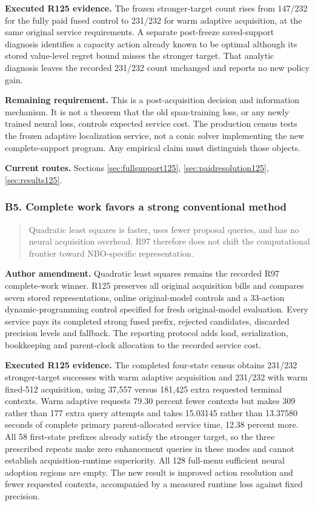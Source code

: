\noindent\textbf{Executed R125 evidence.} The frozen stronger-target count rises from 147/232 for the fully paid fused control to 231/232 for warm adaptive acquisition, at the same original service requirements. A separate post-freeze saved-support diagnosis identifies a capacity action already known to be optimal although its stored value-level regret bound misses the stronger target. That analytic diagnosis leaves the recorded 231/232 count unchanged and reports no new policy gain.

\noindent\textbf{Remaining requirement.} This is a post-acquisition decision and information mechanism. It is not a theorem that the old span-training loss, or any newly trained neural loss, controls expected service cost. The production census tests the frozen adaptive localization service, not a conic solver implementing the new complete-support program. Any empirical claim must distinguish those objects.

\noindent\textbf{Current routes.} Sections \ref{sec:fullsupport125}, \ref{sec:paidresolution125}, \ref{sec:results125}.

\subsubsection{B5. Complete work favors a strong conventional method}

\begin{quote}\small
Quadratic least squares is faster, uses fewer proposal queries, and has no neural acquisition overhead. R97 therefore does not shift the computational frontier toward NBO-specific representation.
\end{quote}

\noindent\textbf{Author amendment.} Quadratic least squares remains the recorded R97 complete-work winner. R125 preserves all original acquisition bills and compares seven stored representations, online original-model controls and a 33-action dynamic-programming control specified for fresh original-model evaluation. Every service pays its completed strong fused prefix, rejected candidates, discarded precision levels and fallback. The reporting protocol adds load, serialization, bookkeeping and parent-clock allocation to the recorded service cost.

\noindent\textbf{Executed R125 evidence.} The completed four-state census obtains 231/232 stronger-target successes with warm adaptive acquisition and 231/232 with warm fixed-512 acquisition, using 37,557 versus 181,425 extra requested terminal contexts. Warm adaptive requests 79.30 percent fewer contexts but makes 309 rather than 177 extra query attempts and takes 15.03145 rather than 13.37580 seconds of complete primary parent-allocated service time, 12.38 percent more. All 58 first-state prefixes already satisfy the stronger target, so the three prescribed repeats make zero enhancement queries in these modes and cannot establish acquisition-runtime superiority. All 128 full-menu sufficient neural adoption regions are empty. The new result is improved action resolution and fewer requested contexts, accompanied by a measured runtime loss against fixed precision.

